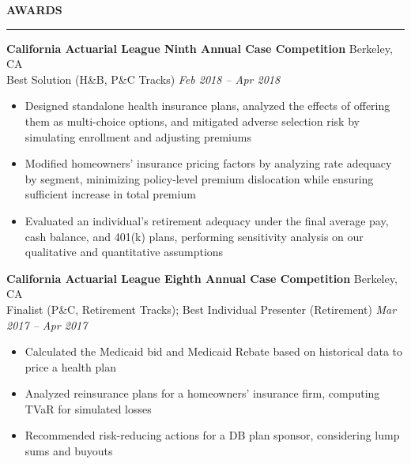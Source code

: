 \documentclass[11pt,letterpaper]{article}
\newcommand{\sectline}{\vspace{4pt}\hrule height 1.5pt\vspace{4pt}}
\newcommand{\smallspace}{\vspace{4pt}}
\begin{document}
\textbf{AWARDS} \sectline


\textbf{California Actuarial League Ninth Annual Case Competition} \hfill Berkeley, CA \\
Best Solution (H\&B, P\&C Tracks) \hfill \textit{Feb 2018 -- Apr 2018} \\
\begin{itemize}
	\item Designed standalone health insurance plans, analyzed the effects of offering them as multi-choice options, and mitigated adverse selection risk by simulating enrollment and adjusting premiums
	\item Modified homeowners' insurance pricing factors by analyzing rate adequacy by segment, minimizing policy-level premium dislocation while ensuring sufficient increase in total premium
	\item Evaluated an individual's retirement adequacy under the final average pay, cash balance, and 401(k) plans, performing sensitivity analysis on our qualitative and quantitative assumptions
\end{itemize}
\smallspace 
\textbf{California Actuarial League Eighth Annual Case Competition} \hfill Berkeley, CA \\
Finalist (P\&C, Retirement Tracks); Best Individual Presenter (Retirement) \hfill \textit{Mar 2017 -- Apr 2017} \\
\begin{itemize}
	\item Calculated the Medicaid bid and Medicaid Rebate based on historical data to price a health plan
	\item Analyzed reinsurance plans for a homeowners' insurance firm, computing TVaR for simulated losses
	\item Recommended risk-reducing actions for a DB plan sponsor, considering lump sums and buyouts 
\end{itemize}
\end{document}
